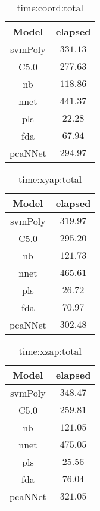 \begin{table}[!ht]
	\centering
	\begin{tabular}{|c|c|}
		\hline
		Model & elapsed \\ \hline
		svmPoly & $331.13$ \\ \hline
		C5.0 & $277.63$ \\ \hline
		nb & $118.86$ \\ \hline
		nnet & $441.37$ \\ \hline
		pls & $22.28$ \\ \hline
		fda & $67.94$ \\ \hline
		pcaNNet & $294.97$ \\ \hline
	\end{tabular}
	\caption{time:coord:total}
	\label{tab:time:coord:total}
\end{table}

\begin{table}[!ht]
	\centering
	\begin{tabular}{|c|c|}
		\hline
		Model & elapsed \\ \hline
		svmPoly & $319.97$ \\ \hline
		C5.0 & $295.20$ \\ \hline
		nb & $121.73$ \\ \hline
		nnet & $465.61$ \\ \hline
		pls & $26.72$ \\ \hline
		fda & $70.97$ \\ \hline
		pcaNNet & $302.48$ \\ \hline
	\end{tabular}
	\caption{time:xyap:total}
	\label{tab:time:xyap:total}
\end{table}

\begin{table}[!ht]
	\centering
	\begin{tabular}{|c|c|}
		\hline
		Model & elapsed \\ \hline
		svmPoly & $348.47$ \\ \hline
		C5.0 & $259.81$ \\ \hline
		nb & $121.05$ \\ \hline
		nnet & $475.05$ \\ \hline
		pls & $25.56$ \\ \hline
		fda & $76.04$ \\ \hline
		pcaNNet & $321.05$ \\ \hline
	\end{tabular}
	\caption{time:xzap:total}
	\label{tab:time:xzap:total}
\end{table}


